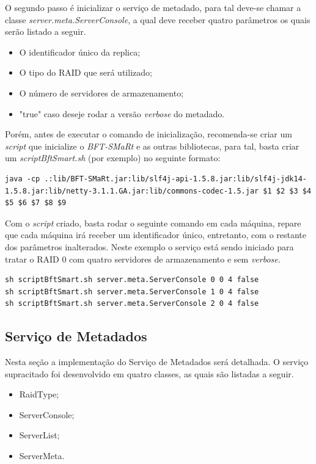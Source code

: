 O segundo passo é inicializar o serviço de metadado, para tal deve-se chamar a classe \textit{server.meta.ServerConsole}, a qual deve receber quatro parâmetros os quais serão listado a seguir. 
 
\begin{itemize}
	\item O identificador único da replica;
	\item O tipo do RAID que será utilizado;
	\item O número de servidores de armazenamento;
	\item "true" caso deseje rodar a versão \textit{verbose} do metadado.
\end{itemize}

Porém, antes de executar o comando de inicialização, recomenda-se criar um \textit{script} que inicialize o \textit{BFT-SMaRt} e as outras bibliotecas, para tal, basta criar um \textit{scriptBftSmart.sh} (por exemplo) no seguinte formato:

\begin{lstlisting}
java -cp .:lib/BFT-SMaRt.jar:lib/slf4j-api-1.5.8.jar:lib/slf4j-jdk14-1.5.8.jar:lib/netty-3.1.1.GA.jar:lib/commons-codec-1.5.jar $1 $2 $3 $4 $5 $6 $7 $8 $9
\end{lstlisting}

Com o \textit{script} criado, basta rodar o seguinte comando em cada máquina, repare que cada máquina irá receber um identificador único, entretanto, com o restante dos parâmetros inalterados. Neste exemplo o serviço está sendo iniciado para tratar o RAID 0 com quatro servidores de armazenamento e sem \textit{verbose.}

\begin{lstlisting}
sh scriptBftSmart.sh server.meta.ServerConsole 0 0 4 false
sh scriptBftSmart.sh server.meta.ServerConsole 1 0 4 false
sh scriptBftSmart.sh server.meta.ServerConsole 2 0 4 false
\end{lstlisting}
	
\subsection{Serviço de Metadados}
Nesta seção a implementação do Serviço de Metadados será detalhada. O serviço supracitado foi desenvolvido em quatro classes, as quais são listadas a seguir.
\\

\begin{itemize}
	\item RaidType;
	\item ServerConsole;
	\item ServerList;
	\item ServerMeta.
\end{itemize}

